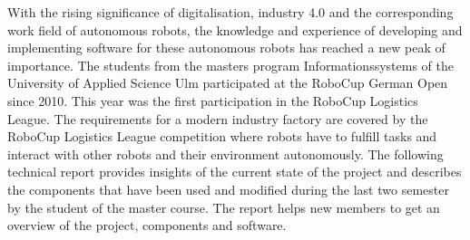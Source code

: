 With the rising significance of digitalisation, industry 4.0 and the corresponding work field of autonomous robots, the knowledge and experience of developing and implementing software for these autonomous robots has reached a new peak of importance. The students from the masters program Informationssystems of the University of Applied Science Ulm participated at the RoboCup German Open since 2010. This year was the first participation in the RoboCup Logistics League. The requirements for a modern industry factory are covered by the RoboCup Logistics League competition where robots have to fulfill tasks and interact with other robots and their environment autonomously. The following technical report provides insights of the current state of the project and describes the components that have been used and modified during the last two semester by the student of the master course. The report helps new members to get an overview of the project, components and software.